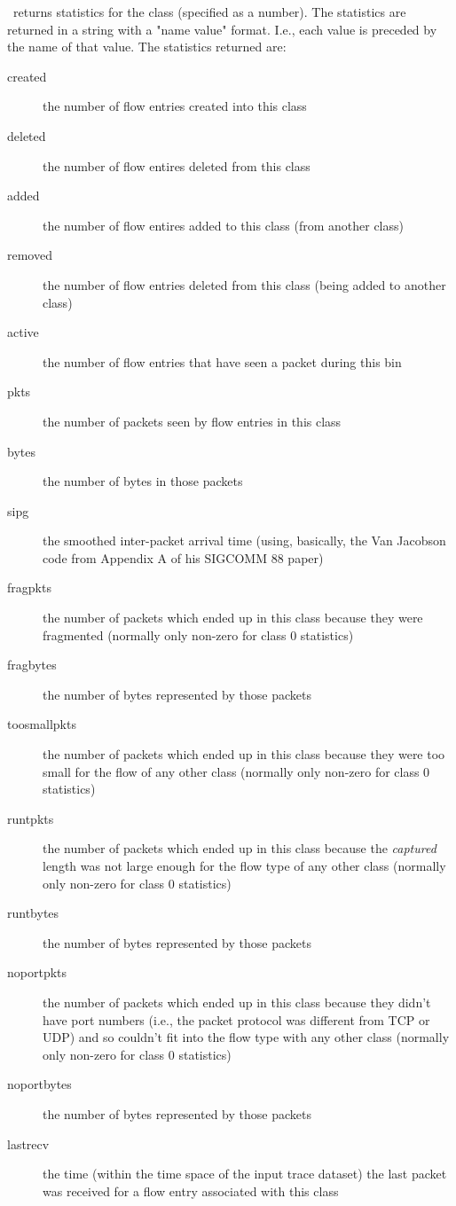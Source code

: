 \documentclass{article}
\begin{document}
\cmdname\ returns statistics for the class 
(specified as a number).  The statistics are returned in a string with
a "name value" format.  I.e., each value is preceded by the name of
that value.  The statistics returned are:
\begin{description}
\item[created] the number of flow entries created into this class
\item[deleted] the number of flow entires deleted from this class
\item[added] the number of flow entires added to this class (from
another class)
\item[removed] the number of flow entries deleted from this class
(being added to another class)
\item[active] the number of flow entries that have seen a packet during
this bin
\item[pkts] the number of packets seen by flow entries in this class
\item[bytes] the number of bytes in those packets
\item[sipg] the smoothed inter-packet arrival time (using, basically,
the Van Jacobson code from Appendix A of his SIGCOMM 88 paper)
\item[fragpkts] the number of packets which ended up in this class
because they were fragmented (normally only non-zero for class 0 statistics)
\item[fragbytes] the number of bytes represented by those packets
\item[toosmallpkts] the number of packets which ended up in this class
because they were too small for the flow of any other class
(normally only non-zero for class 0 statistics)
\item[runtpkts] the number of packets which ended up in this class
because the \emph{captured} length was not large enough for the flow
type of any other class (normally only non-zero for class 0 statistics)
\item[runtbytes] the number of bytes represented by those packets
\item[noportpkts] the number of packets which ended up in this class
because they didn't have port numbers (i.e., the packet protocol was
different from TCP or UDP) and so couldn't fit into the flow type with
any other class (normally only non-zero for class 0 statistics)
\item[noportbytes] the number of bytes represented by those packets
\item[lastrecv] the time (within the time space of the input trace
dataset) the last packet was received for a flow entry associated with
this class
\end{description}
\end{document}

